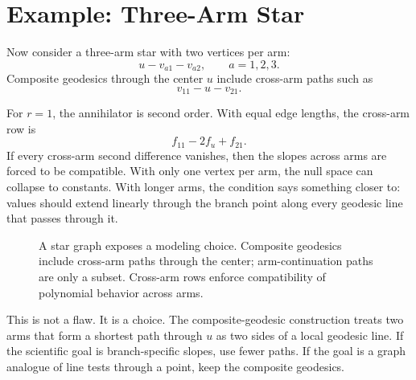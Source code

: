 \documentclass[11pt]{article}
\begin{document}
\section{Example: Three-Arm Star}

Now consider a three-arm star with two vertices per arm:
\[
  u-v_{a1}-v_{a2},
  \qquad a=1,2,3.
\]
Composite geodesics through the center \(u\) include cross-arm paths such as
\[
  v_{11}-u-v_{21}.
\]

For \(r=1\), the annihilator is second order.  With equal edge lengths, the
cross-arm row is
\[
  f_{11}-2f_u+f_{21}.
\]
If every cross-arm second difference vanishes, then the slopes across arms are
forced to be compatible.  With only one vertex per arm, the null space can
collapse to constants.  With longer arms, the condition says something closer
to: values should extend linearly through the branch point along every
geodesic line that passes through it.

\begin{figure}[ht]
\centering
{}
\caption{A star graph exposes a modeling choice.  Composite geodesics include
cross-arm paths through the center; arm-continuation paths are only a subset.
Cross-arm rows enforce compatibility of polynomial behavior across arms.}
\end{figure}

This is not a flaw.  It is a choice.  The composite-geodesic construction treats
two arms that form a shortest path through \(u\) as two sides of a local
geodesic line.  If the scientific goal is branch-specific slopes, use fewer
paths.  If the goal is a graph analogue of line tests through a point, keep the
composite geodesics.
\end{document}
